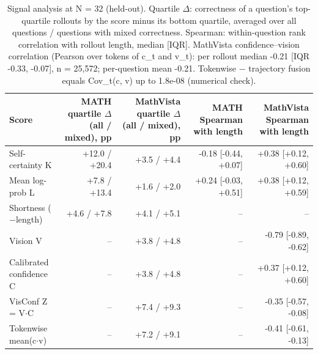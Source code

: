 \begin{table}[t]
\centering
\small
\caption{Signal analysis at N = 32 (held-out). Quartile $\Delta$: correctness of a question's top-quartile rollouts by the score minus its bottom quartile, averaged over all questions / questions with mixed correctness. Spearman: within-question rank correlation with rollout length, median [IQR]. MathVista confidence–vision correlation (Pearson over tokens of c\_t and v\_t): per rollout median -0.21 [IQR -0.33, -0.07], n = 25,572; per-question mean -0.21. Tokenwise − trajectory fusion equals Cov\_t(c, v) up to 1.8e-08 (numerical check).}
\label{tab:t3-signals}
\begin{tabular}{lrrrr}
\toprule
Score & MATH quartile $\Delta$ (all / mixed), pp & MathVista quartile $\Delta$ (all / mixed), pp & MATH Spearman with length & MathVista Spearman with length \\
\midrule
Self-certainty K & +12.0 / +20.4 & +3.5 / +4.4 & -0.18 [-0.44, +0.07] & +0.38 [+0.12, +0.60] \\
Mean log-prob L & +7.8 / +13.4 & +1.6 / +2.0 & +0.24 [-0.03, +0.51] & +0.38 [+0.12, +0.59] \\
Shortness ($-$length) & +4.6 / +7.8 & +4.1 / +5.1 & – & – \\
Vision V & – & +3.8 / +4.8 & – & -0.79 [-0.89, -0.62] \\
Calibrated confidence C & – & +3.8 / +4.8 & – & +0.37 [+0.12, +0.60] \\
VisConf Z = V$\cdot$C & – & +7.4 / +9.3 & – & -0.35 [-0.57, -0.08] \\
Tokenwise mean(c$\cdot$v) & – & +7.2 / +9.1 & – & -0.41 [-0.61, -0.13] \\
\bottomrule
\end{tabular}
\end{table}
